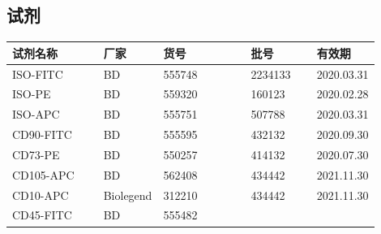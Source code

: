\documentclass[UTF8,10pt,a4paper,fontset=fandol]{ctexart}
\newcommand{\fieldvalue}[1]{#1}
\newcommand{\handwritten}[1]{#1}
\begin{document}
\subsection{试剂}

\begin{tabular}{|p{0.28\linewidth}|p{0.16\linewidth}|p{0.27\linewidth}|p{0.19\linewidth}|}
\hline
试剂名称 & 厂家 & 货号 & 批号 & 有效期 \\
\hline
ISO-FITC & BD & 555748 &
\fieldvalue{\handwritten{2234133}} &
\fieldvalue{\handwritten{2020.03.31}} \\
\hline
ISO-PE & BD & 559320 &
\fieldvalue{\handwritten{160123}} &
\fieldvalue{\handwritten{2020.02.28}} \\
\hline
ISO-APC & BD & 555751 &
\fieldvalue{\handwritten{507788}} &
\fieldvalue{\handwritten{2020.03.31}} \\
\hline
CD90-FITC & BD & 555595 &
\fieldvalue{\handwritten{432132}} &
\fieldvalue{\handwritten{2020.09.30}} \\
\hline
CD73-PE & BD & 550257 &
\fieldvalue{\handwritten{414132}} &
\fieldvalue{\handwritten{2020.07.30}} \\
\hline
CD105-APC & BD & 562408 &
\fieldvalue{\handwritten{434442}} &
\fieldvalue{\handwritten{2021.11.30}} \\
\hline
CD10-APC & Biolegend & 312210 &
\fieldvalue{\handwritten{434442}} &
\fieldvalue{\handwritten{2021.11.30}} \\
\hline
CD45-FITC & BD & 555482 &

\end{tabular}
\end{document}
